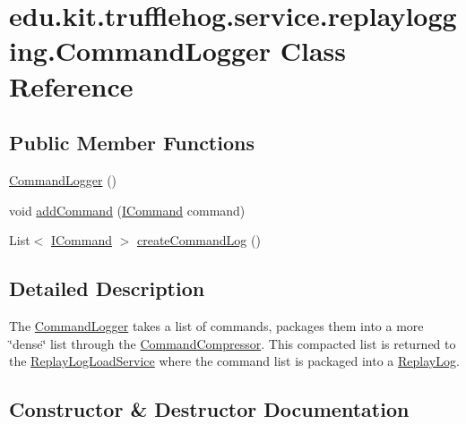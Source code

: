 \hypertarget{classedu_1_1kit_1_1trufflehog_1_1service_1_1replaylogging_1_1_command_logger}{}\section{edu.\+kit.\+trufflehog.\+service.\+replaylogging.\+Command\+Logger Class Reference}
\label{classedu_1_1kit_1_1trufflehog_1_1service_1_1replaylogging_1_1_command_logger}
\subsection*{Public Member Functions}
\begin{DoxyCompactItemize}
\item 
\hyperlink{classedu_1_1kit_1_1trufflehog_1_1service_1_1replaylogging_1_1_command_logger_a7af35375c6489ee18c149488d78fdfbc}{Command\+Logger} ()
\item 
void \hyperlink{classedu_1_1kit_1_1trufflehog_1_1service_1_1replaylogging_1_1_command_logger_a5e4c8ec9aed211dd3d67b9dd8a88d181}{add\+Command} (\hyperlink{interfaceedu_1_1kit_1_1trufflehog_1_1command_1_1_i_command}{I\+Command} command)
\item 
List$<$ \hyperlink{interfaceedu_1_1kit_1_1trufflehog_1_1command_1_1_i_command}{I\+Command} $>$ \hyperlink{classedu_1_1kit_1_1trufflehog_1_1service_1_1replaylogging_1_1_command_logger_a996698fff844068fabacb5e391cda8d3}{create\+Command\+Log} ()
\end{DoxyCompactItemize}


\subsection{Detailed Description}
The \hyperlink{classedu_1_1kit_1_1trufflehog_1_1service_1_1replaylogging_1_1_command_logger}{Command\+Logger} takes a list of commands, packages them into a more \char`\"{}dense\char`\"{} list through the \hyperlink{classedu_1_1kit_1_1trufflehog_1_1service_1_1replaylogging_1_1_command_compressor}{Command\+Compressor}. This compacted list is returned to the \hyperlink{classedu_1_1kit_1_1trufflehog_1_1service_1_1replaylogging_1_1_replay_log_load_service}{Replay\+Log\+Load\+Service} where the command list is packaged into a \hyperlink{classedu_1_1kit_1_1trufflehog_1_1service_1_1replaylogging_1_1_replay_log}{Replay\+Log}. 

\subsection{Constructor \& Destructor Documentation}
\hypertarget{classedu_1_1kit_1_1trufflehog_1_1service_1_1replaylogging_1_1_command_logger_a7af35375c6489ee18c149488d78fdfbc}{}
